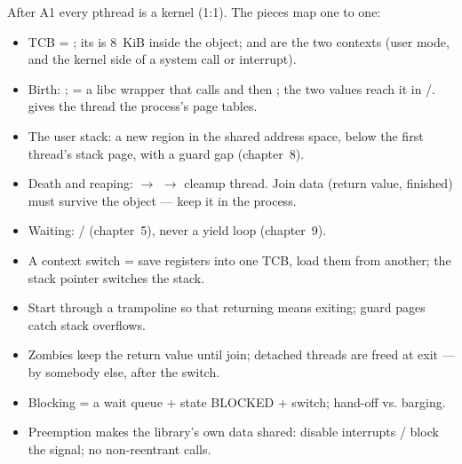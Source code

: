 \begin{swebbox}
After A1 every pthread is a kernel  (1:1). The pieces map
one to one:
\begin{itemize}
  \item TCB = ; its  is 8~KiB inside
    the object;  and  are
    the two contexts (user mode, and the kernel side of a system call or
    interrupt).
  \item Birth: ;  = a libc wrapper that
    calls  and then ; the two
    values reach it in /.  gives
    the thread the process's page tables.
  \item The user stack: a new region in the shared address space, below
    the first thread's stack page, with a guard gap (chapter~8).
  \item Death and reaping:  $\to$  $\to$
    cleanup thread. Join data (return value, finished) must survive the
     object --- keep it in the process.
  \item Waiting: / (chapter~5), never a yield
    loop (chapter~9).
\end{itemize}
\end{swebbox}

\begin{keybox}
\begin{itemize}
  \item A context switch = save registers into one TCB, load them from
    another; the stack pointer switches the stack.
  \item Start through a trampoline so that returning means exiting; guard
    pages catch stack overflows.
  \item Zombies keep the return value until join; detached threads are
    freed at exit --- by somebody else, after the switch.
  \item Blocking = a wait queue + state BLOCKED + switch; hand-off vs.
    barging.
  \item Preemption makes the library's own data shared: disable
    interrupts / block the signal; no non-reentrant calls.
\end{itemize}
\end{keybox}
